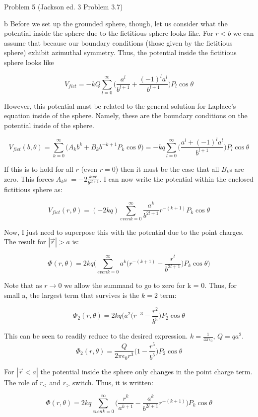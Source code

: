 \begin{homeworkProblem}{Problem 5 (Jackson ed. 3 Problem 3.7)}
\begin{homeworkSection}{b}
Before we set up the grounded sphere, though, let us consider what the potential inside the sphere due to the fictitious sphere looks like. For $r<b$ we can assume that because our boundary conditions (those given by the fictitious sphere) exhibit azimuthal symmetry. Thus, the potential inside the fictitious sphere looks like

\begin{center}
\[
V_{fict} = -kQ \sum\limits_{l=0}^{\infty}\Big(\frac{a^l}{b^{l+1}} + \frac{(-1)^l a^l}{b^{l+1}}\Big) P_l\cos\theta
\]
\end{center}

However, this potential must be related to the general solution for Laplace's equation inside of the sphere. Namely, these are the boundary conditions on the potential inside of the sphere.

\begin{center}
\[
	V_{fict}(b,\theta) = \sum\limits_{k=0}^{\infty}\Big(A_k b^k + B_k b^{-k+1} P_k\cos\theta \Big) = -kq \sum\limits_{l=0}^{\infty}\Big(\frac{a^l+(-1)^l a^l}{b^{l+1}}\Big) P_l\cos\theta
\]
\end{center}

If this is to hold for all $r$ (even $r=0$) then it must be the case that all $B_k$s are zero. This forces $A_k$s $=-2\frac{kq a^l}{b^{2l+1}}$. I can now write the potential within the enclosed fictitious sphere as:

\begin{center}
\[
V_{fict}(r,\theta) = (-2kq) \sum\limits_{even k=0}^\infty \frac{a^k}{b^{2l+1}} r^{-(k+1)} P_k\cos\theta
\]
\end{center}

Now, I just need to superpose this with the potential due to the point charges. The result for $|\vec{r}|>a$ is:

\[
\Phi(r,\theta) = 2kq \bigg( \sum\limits_{even k=0}^\infty a^k \Big(r^{-(k+1)}-\frac{r^l}{b^{2l+1}}\Big) P_k\cos\theta \bigg)
\]

Note that as $r \rightarrow 0$ we allow the summand to go to zero for k = 0. Thus, for small a, the largest term that survives is the $k=2$ term:

\[
\Phi_2(r,\theta) = 2kq\bigg( a^2(r^{-3} - \frac{r^2}{b^5} \bigg)P_2\cos\theta
\]

This can be seen to readily reduce to the desired expression. $k = \frac{1}{4\pi\epsilon_0}$, $Q = qa^2$.
\[ \Phi_2(r,\theta) = \frac{Q}{2\pi\epsilon_0 r^3}\bigg(1 - \frac{r^5}{b^5} \bigg)P_2\cos\theta \]

For $|\vec{r}<a|$ the potential inside the sphere only changes in the point charge term. The role of $r_<$ and $r_>$ switch. Thus, it is written:

\[
\Phi(r,\theta) = 2kq \sum\limits_{even k = 0}^{\infty} \bigg( \frac{r^k}{a^{k+1}} - \frac{a^k}{b^{2l+1}}r^{-(k+1)}\bigg) P_k\cos\theta
\]
\end{homeworkSection}

\end{homeworkProblem}